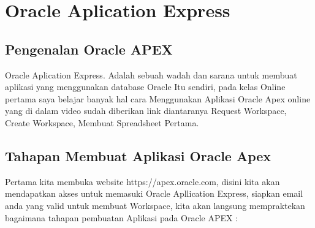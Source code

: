 \chapter{Oracle Aplication Express}

\section{Pengenalan Oracle APEX}
Oracle Aplication Express\cite{OracleApex}. Adalah sebuah wadah dan sarana untuk membuat aplikasi yang menggunakan database Oracle Itu sendiri, pada kelas Online pertama saya belajar banyak hal cara Menggunakan Aplikasi Oracle Apex online yang di dalam video sudah diberikan link diantaranya Request Workspace, Create Workspace, Membuat Spreadsheet Pertama.

\section{Tahapan Membuat Aplikasi Oracle Apex}
Pertama kita membuka website https://apex.oracle.com, disini kita akan mendapatkan akses untuk memasuki Oracle Apllication Express, siapkan email anda yang valid untuk membuat Workspace, kita akan langsung mempraktekan bagaimana tahapan pembuatan Aplikasi pada Oracle APEX :

